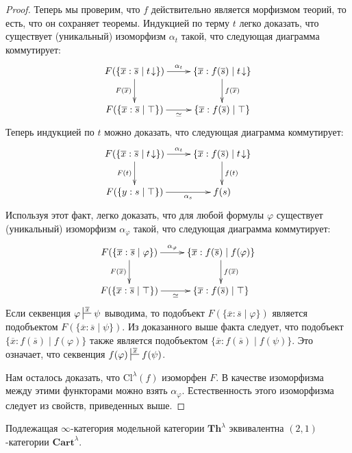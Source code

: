 \documentclass[reqno]{amsart}
\theoremstyle{definition}
\theoremstyle{remark}
\newcommand{\bcat}[1]{\mathbf{#1}}
\newcommand{\fs}[1]{\mathrm{#1}}
\newcommand{\Th}{\bcat{Th}}
\begin{document}
\begin{proof}
Теперь мы проверим, что $f$ действительно является морфизмом теорий, то есть, что он сохраняет теоремы.
Индукцией по терму $t$ легко доказать, что существует (уникальный) изоморфизм $\alpha_t$ такой, что следующая диаграмма коммутирует:
\[ \xymatrix{ F(\{ \overline{x} : \overline{s} \mid t\!\downarrow \}) \ar[r]^-{\alpha_t} \ar[d]_{F(\overline{x})} & \{ \overline{x} : f(\overline{s}) \mid t\!\downarrow \} \ar[d]^{f(\overline{x})} \\
              F(\{ \overline{x} : \overline{s} \mid \top \}) \ar[r]_-{\simeq}                                     & \{ \overline{x} : f(\overline{s}) \mid \top \}
            } \]
Теперь индукцией по $t$ можно доказать, что следующая диаграмма коммутирует:
\[ \xymatrix{ F(\{ \overline{x} : \overline{s} \mid t\!\downarrow \}) \ar[r]^-{\alpha_t} \ar[d]_{F(t)} & \{ \overline{x} : f(\overline{s}) \mid t\!\downarrow \} \ar[d]^{f(t)} \\
              F(\{ y : s \mid \top \}) \ar[r]_-{\alpha_s}                                              & f(s)
            } \]
Используя этот факт, легко доказать, что для любой формулы $\varphi$ существует (уникальный) изоморфизм $\alpha_\varphi$ такой, что следующая диаграмма коммутирует:
\[ \xymatrix{ F(\{ \overline{x} : \overline{s} \mid \varphi \}) \ar[r]^-{\alpha_\varphi} \ar[d]_{F(\overline{x})} & \{ \overline{x} : f(\overline{s}) \mid f(\varphi) \} \ar[d]^{f(\overline{x})} \\
              F(\{ \overline{x} : \overline{s} \mid \top \}) \ar[r]_-{\simeq}                                     & \{ \overline{x} : f(\overline{s}) \mid \top \}
            } \]
Если секвенция $\varphi \sststile{}{\overline{x}} \psi$ выводима, то подобъект $F(\{ \overline{x} : \overline{s} \mid \varphi \})$ является подобъектом $F(\{ \overline{x} : \overline{s} \mid \psi \})$.
Из доказанного выше факта следует, что подобъект $\{ \overline{x} : f(\overline{s}) \mid f(\varphi) \}$ также является подобъектом $\{ \overline{x} : f(\overline{s}) \mid f(\psi) \}$.
Это означает, что секвенция $f(\varphi) \sststile{}{\overline{x}} f(\psi)$.

Нам осталось доказать, что $\fs{Cl}^\lambda(f)$ изоморфен $F$.
В качестве изоморфизма между этими функторами можно взять $\alpha_\varphi$.
Естественность этого изоморфизма следует из свойств, приведенных выше.
\end{proof}

\begin{cor}
Подлежащая $\infty$-категория модельной категории $\Th^\lambda$ эквивалентна $(2,1)$-категории $\bcat{Cart}^\lambda$.
\end{cor}
\end{document}

